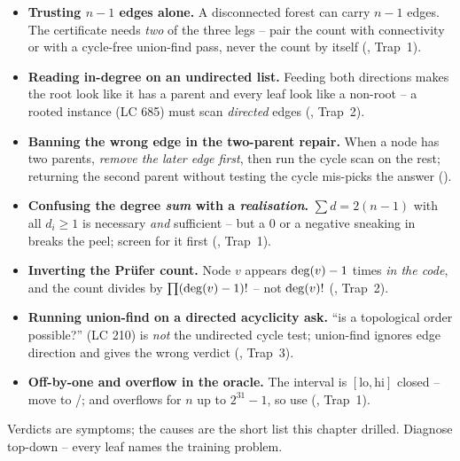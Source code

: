 \begin{itemize}[nosep, leftmargin=1.4em]
  \item \textbf{Trusting $n-1$ edges alone.} A disconnected forest can carry $n-1$ edges. The
        certificate needs \emph{two} of the three legs -- pair the count with connectivity or with
        a cycle-free union-find pass, never the count by itself (, Trap~1).
  \item \textbf{Reading in-degree on an undirected list.} Feeding both directions makes the root
        look like it has a parent and every leaf look like a non-root -- a rooted instance (LC 685)
        must scan \emph{directed} edges (, Trap~2).
  \item \textbf{Banning the wrong edge in the two-parent repair.} When a node has two parents,
        \emph{remove the later edge first}, then run the cycle scan on the rest; returning the
        second parent without testing the cycle mis-picks the answer ().
  \item \textbf{Confusing the degree \emph{sum} with a \emph{realisation}.} $\sum d=2(n-1)$ with
        all $d_i\ge1$ is necessary \emph{and} sufficient -- but a $0$ or a negative sneaking in
        breaks the peel; screen for it first (, Trap~1).
  \item \textbf{Inverting the Pr\"ufer count.} Node $v$ appears $\operatorname{deg}(v)-1$ times \emph{in the
        code}, and the count divides by $\prod(\operatorname{deg}(v)-1)!$ -- not $\operatorname{deg}(v)!$
        (, Trap~2).
  \item \textbf{Running union-find on a directed acyclicity ask.} ``is a topological order
        possible?'' (LC 210) is \emph{not} the undirected cycle test; union-find ignores edge
        direction and gives the wrong verdict (, Trap~3).
  \item \textbf{Off-by-one and overflow in the oracle.} The interval is $[\text{lo},\text{hi}]$
        closed -- move to /; and  overflows for
        $n$ up to $2^{31}{-}1$, so use  (, Trap~1).
\end{itemize}


Verdicts are symptoms; the causes are the short list this chapter drilled. Diagnose top-down --
every leaf names the training problem.


